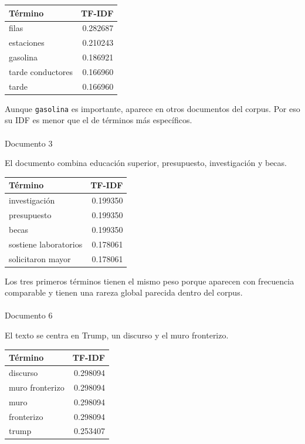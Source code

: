 \documentclass[
  spanish,
  letterpaper,
  DIV=11,
  numbers=noendperiod]{scrartcl}
\makeatletter
\let\oldparagraph\paragraph
\renewcommand{\paragraph}{
    \@ifstar
      \xxxParagraphStar
      \xxxParagraphNoStar
  }
\newcommand{\xxxParagraphStar}[1]{\oldparagraph*{#1}\mbox{}}
\newcommand{\xxxParagraphNoStar}[1]{\oldparagraph{#1}\mbox{}}
\makeatother
\begin{document}
\begin{longtable}[]{@{}lr@{}}
\toprule\noalign{}
Término & TF-IDF \\
\midrule\noalign{}
\endhead
\bottomrule\noalign{}
\endlastfoot
filas & 0.282687 \\
estaciones & 0.210243 \\
gasolina & 0.186921 \\
tarde conductores & 0.166960 \\
tarde & 0.166960 \\
\end{longtable}

Aunque \texttt{gasolina} es importante, aparece en otros documentos del
corpus. Por eso su IDF es menor que el de términos más específicos.

\paragraph{Documento 3}\label{documento-3}

El documento combina educación superior, presupuesto, investigación y
becas.

\begin{longtable}[]{@{}lr@{}}
\toprule\noalign{}
Término & TF-IDF \\
\midrule\noalign{}
\endhead
\bottomrule\noalign{}
\endlastfoot
investigación & 0.199350 \\
presupuesto & 0.199350 \\
becas & 0.199350 \\
sostiene laboratorios & 0.178061 \\
solicitaron mayor & 0.178061 \\
\end{longtable}

Los tres primeros términos tienen el mismo peso porque aparecen con
frecuencia comparable y tienen una rareza global parecida dentro del
corpus.

\paragraph{Documento 6}\label{documento-6}

El texto se centra en Trump, un discurso y el muro fronterizo.

\begin{longtable}[]{@{}lr@{}}
\toprule\noalign{}
Término & TF-IDF \\
\midrule\noalign{}
\endhead
\bottomrule\noalign{}
\endlastfoot
discurso & 0.298094 \\
muro fronterizo & 0.298094 \\
muro & 0.298094 \\
fronterizo & 0.298094 \\
trump & 0.253407 \\
\end{longtable}
\end{document}
